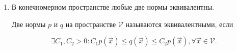 \begin{enumerate}[label={\arabic*°.}]
    \item В конечномерном пространстве любые две нормы эквивалентны.

    \begin{definition}[P.S.]
        Две нормы $p$ и $q$ на пространстве $\mathcal{V}$ называются эквивалентными, если
        
        $$\exists C_1, C_2 > 0 \colon C_1p(\vec{x}) \leq q(\vec{x}) \leq C_2p(\vec{x}), \forall \vec{x} \in \mathcal{V}.$$
    \end{definition}
\end{enumerate}
